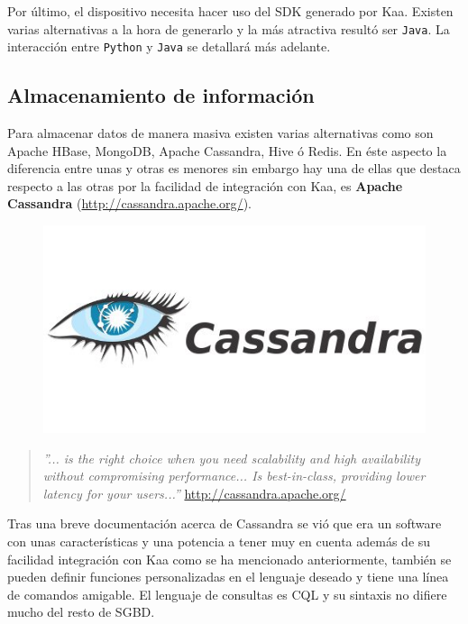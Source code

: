 \bigskip
Por último, el dispositivo necesita hacer uso del SDK generado por Kaa. Existen varias alternativas a la hora de generarlo y la más atractiva resultó ser {\tt Java}. La interacción entre {\tt Python} y {\tt Java} se detallará más adelante.

\subsection{Almacenamiento de información}

Para almacenar datos de manera masiva existen varias alternativas como son Apache HBase, MongoDB, Apache Cassandra, Hive ó Redis. En éste aspecto la diferencia entre unas y otras es menores sin embargo hay una de ellas que destaca respecto a las otras por la facilidad de integración con Kaa, es \textbf{Apache Cassandra} (\url{http://cassandra.apache.org/}).

\begin{figure}[!ht]
  \begin{center}
    \includegraphics[scale=0.60]{../images/cassandra/logo.jpg}
    \label{fig:cassalog}
	\end{center}
\end{figure}

\begin{quote}\textit{ ''... is the right choice when you need scalability and high availability without compromising performance... Is best-in-class, providing lower latency for your users...''
}
\newline
\url{http://cassandra.apache.org/}
\end{quote}

Tras una breve documentación acerca de Cassandra se vió que era un software con unas características y una potencia a tener muy en cuenta además de su facilidad integración con Kaa como se ha mencionado anteriormente, también se pueden definir funciones personalizadas en el lenguaje deseado y tiene una línea de comandos amigable. El lenguaje de consultas es CQL y su sintaxis no difiere mucho del resto de SGBD.



